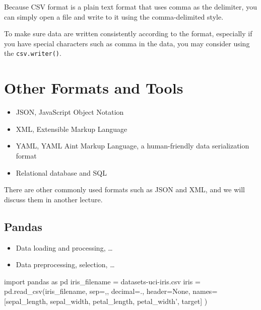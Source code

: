 \documentclass[
  letterpaper,
]{scrbook}
\newenvironment{Shaded}{\begin{snugshade}}{\end{snugshade}}
\newcommand{\ErrorTok}[1]{\textcolor[rgb]{0.68,0.00,0.00}{#1}}
\newcommand{\ImportTok}[1]{\textcolor[rgb]{0.00,0.46,0.62}{#1}}
\newcommand{\NormalTok}[1]{\textcolor[rgb]{0.00,0.23,0.31}{#1}}
\newcommand{\OperatorTok}[1]{\textcolor[rgb]{0.37,0.37,0.37}{#1}}
\newcommand{\StringTok}[1]{\textcolor[rgb]{0.13,0.47,0.30}{#1}}
\newcommand{\VariableTok}[1]{\textcolor[rgb]{0.07,0.07,0.07}{#1}}
\providecommand{\tightlist}{%
  \setlength{\itemsep}{0pt}\setlength{\parskip}{0pt}}
\begin{document}
Because CSV format is a plain text format that uses comma as the
delimiter, you can simply open a file and write to it using the
comma-delimited style.

To make sure data are written consistently according to the format,
especially if you have special characters such as comma in the data, you
may consider using the \texttt{csv.writer()}.

\section*{Other Formats and Tools}\label{other-formats-and-tools}


\begin{itemize}
\tightlist
\item
  JSON, JavaScript Object Notation
\item
  XML, Extensible Markup Language
\item
  YAML, YAML Ain\textquotesingle t Markup Language, a human-friendly
  data serialization format
\item
  Relational database and SQL
\end{itemize}

There are other commonly used formats such as JSON and XML, and we will
discuss them in another lecture.

\subsection*{Pandas}\label{pandas}

\begin{itemize}
\tightlist
\item
  Data loading and processing, \ldots{}
\item
  Data preprocessing, selection, \ldots{}
\end{itemize}

\begin{Shaded}
\begin{Highlighting}[]
\ImportTok{import}\NormalTok{ pandas }\ImportTok{as}\NormalTok{ pd}
\NormalTok{iris\_filename }\OperatorTok{=} \StringTok{\textquotesingle{}datasets{-}uci{-}iris.csv\textquotesingle{}}
\NormalTok{iris }\OperatorTok{=}\NormalTok{ pd.read\_csv(iris\_filename, sep}\OperatorTok{=}\StringTok{\textquotesingle{},\textquotesingle{}}\NormalTok{, decimal}\OperatorTok{=}\StringTok{\textquotesingle{}.\textquotesingle{}}\NormalTok{, }
\NormalTok{         header}\OperatorTok{=}\VariableTok{None}\NormalTok{, names}\OperatorTok{=}\NormalTok{ [}\StringTok{\textquotesingle{}sepal\_length\textquotesingle{}}\NormalTok{, }\StringTok{\textquotesingle{}sepal\_width\textquotesingle{}}\NormalTok{, }
                              \StringTok{\textquotesingle{}petal\_length\textquotesingle{}}\NormalTok{, }\StringTok{\textquotesingle{}petal\_width’,}
\ErrorTok{                              \textquotesingle{}target\textquotesingle{}]}
\NormalTok{         )}
\end{Highlighting}
\end{Shaded}
\end{document}
